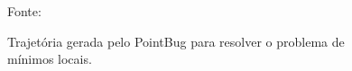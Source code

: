 \documentclass[xcolor=dvipsnames, aspectratio=169]{beamer}
\begin{document}
\begin{frame}
\begin{figure}
    {Fonte: \cite{buniyamin2011simple}}
    \caption{Trajetória gerada pelo PointBug para resolver o problema de mínimos locais.}
    \label{fig:2_range_sensor_obstacle}
  \end{figure}
\end{frame}
  
\end{document}
